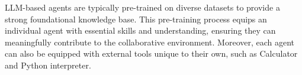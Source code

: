 \documentclass[acmsmall,nonacm]{acmart}
\begin{document}
        LLM-based agents are typically pre-trained on diverse datasets to provide a strong foundational knowledge base. This pre-training process equips an individual agent with essential skills and understanding, ensuring they can meaningfully contribute to the collaborative environment. Moreover, each agent can also be equipped with external tools unique to their own, such as Calculator and Python interpreter.
\end{document}
